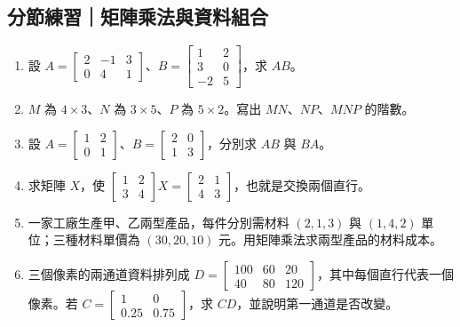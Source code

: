 \documentclass[11pt,a4paper]{article}
\providecommand{\tightlist}{%
  \setlength{\itemsep}{0pt}\setlength{\parskip}{0pt}}
\begin{document}
\begin{HandoutSelfCheck}

\subsection{分節練習｜矩陣乘法與資料組合}\label{ux5206ux7bc0ux7df4ux7fd2ux77e9ux9663ux4e58ux6cd5ux8207ux8cc7ux6599ux7d44ux5408}

\begin{enumerate}
\def\labelenumi{\arabic{enumi}.}
\tightlist
\item
  設 \(A=\begin{bmatrix}2&-1&3\\0&4&1\end{bmatrix}\)、\(B=\begin{bmatrix}1&2\\3&0\\-2&5\end{bmatrix}\)，求 \(AB\)。
\item
  \(M\) 為 \(4\times3\)、\(N\) 為 \(3\times5\)、\(P\) 為 \(5\times2\)。寫出 \(MN\)、\(NP\)、\(MNP\) 的階數。
\item
  設 \(A=\begin{bmatrix}1&2\\0&1\end{bmatrix}\)、\(B=\begin{bmatrix}2&0\\1&3\end{bmatrix}\)，分別求 \(AB\) 與 \(BA\)。
\item
  求矩陣 \(X\)，使 \(\begin{bmatrix}1&2\\3&4\end{bmatrix}X=\begin{bmatrix}2&1\\4&3\end{bmatrix}\)，也就是交換兩個直行。
\item
  一家工廠生產甲、乙兩型產品，每件分別需材料 \((2,1,3)\) 與 \((1,4,2)\) 單位；三種材料單價為 \((30,20,10)\) 元。用矩陣乘法求兩型產品的材料成本。
\item
  三個像素的兩通道資料排列成 \(D=\begin{bmatrix}100&60&20\\40&80&120\end{bmatrix}\)，其中每個直行代表一個像素。若 \(C=\begin{bmatrix}1&0\\0.25&0.75\end{bmatrix}\)，求 \(CD\)，並說明第一通道是否改變。
\end{enumerate}


\end{HandoutSelfCheck}
\end{document}
